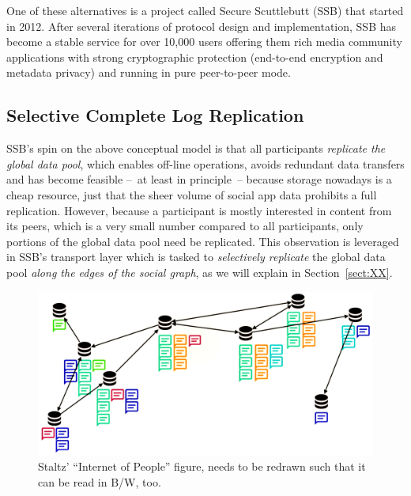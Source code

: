 \documentclass[sigconf]{acmart}
\begin{document}
One of these alternatives is a project called Secure Scuttlebutt (SSB)
that started in 2012. After several iterations of protocol design and
implementation, SSB has become a stable service for over 10,000 users
offering them rich media community applications with strong
cryptographic protection (end-to-end encryption and metadata privacy)
and running in pure peer-to-peer mode.

\subsection*{Selective Complete Log Replication}

SSB's spin on the above conceptual model is that all participants {\em
  replicate the global data pool}, which enables off-line operations,
avoids redundant data transfers and has become feasible --~at least in
principle~-- because storage nowadays is a cheap resource, just that
the sheer volume of social app data prohibits a full
replication. However, because a participant is mostly interested in
content from its peers, which is a very small number compared to all
participants, only portions of the global data pool need be
replicated. This observation is leveraged in SSB's transport layer
which is tasked to {\em selectively replicate} the global data pool
{\em along the edges of the social graph}, as we will explain in
Section~\ref{sect:XX}.

\begin{figure}[htb]
  \includegraphics[width=0.9\columnwidth]{figs/staltz-iop.pdf}
  \caption{Staltz' ``Internet of People'' figure, needs to be redrawn
    such that it can be read in B/W, too.}
\end{figure}
\end{document}
